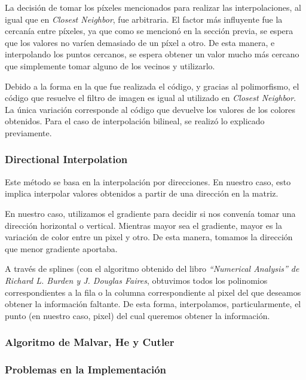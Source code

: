 La decisión de tomar los píxeles mencionados para realizar las interpolaciones, al igual que en \textit{Closest Neighbor}, fue arbitraria. El factor más influyente fue la cercanía entre píxeles, ya que como se mencionó en la sección previa, se espera que los valores no varíen demasiado de un píxel a otro. De esta manera, e interpolando los puntos cercanos, se espera obtener un valor mucho más cercano que simplemente tomar alguno de los vecinos y utilizarlo.
\par 
Debido a la forma en la que fue realizada el código, y gracias al polimorfismo, el código que resuelve el filtro de imagen es igual al utilizado en \textit{Closest Neighbor}. La única variación corresponde al código que devuelve los valores de los colores obtenidos. Para el caso de interpolación bilineal, se realizó lo explicado previamente.

\subsubsection{Directional Interpolation}

Este método se basa en la interpolación por direcciones. En nuestro caso, esto implica interpolar valores obtenidos a partir de una dirección en la matriz. 
\par 
En nuestro caso, utilizamos el gradiente para decidir si nos convenía tomar una dirección horizontal o vertical. Mientras mayor sea el gradiente, mayor es la variación de color entre un pixel y otro. De esta manera, tomamos la dirección que menor gradiente aportaba. 
\par 
A través de splines (con el algoritmo obtenido del libro \textit{``Numerical Analysis'' de Richard L. Burden y J. Douglas Faires}, obtuvimos todos los polinomios correspondientes a la fila o la columna correspondiente al pixel del que deseamos obtener la información faltante. De esta forma, interpolamos, particularmente, el punto (en nuestro caso, pixel) del cual queremos obtener la información.



\subsubsection{Algoritmo de Malvar, He y Cutler}


\subsubsection{Problemas en la Implementación}

